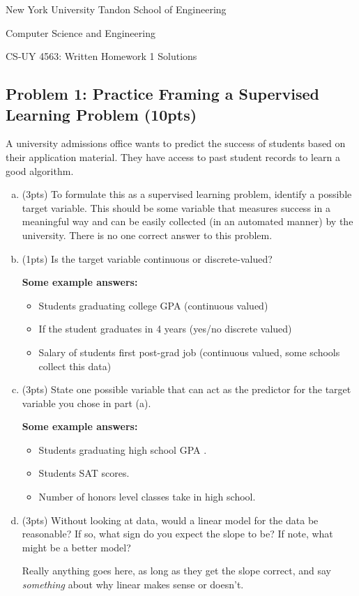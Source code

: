 \documentclass[10pt]{article}
\begin{document}
	
\begin{center}
	\normalsize
	New York University Tandon School of Engineering
	
	Computer Science and Engineering
	\medskip
	
	\large
	CS-UY 4563: Written Homework 1 Solutions


\end{center} 

\subsection{Problem 1: Practice Framing a Supervised Learning Problem (10pts)}
 A university admissions office wants to predict the success of students based on
their application material.  They have access to past student records to learn
a good algorithm.
\begin{enumerate}[(a)]
	\item (3pts) To formulate this as a supervised learning problem,
	identify a possible target variable.  This should be some variable that measures success
	in a meaningful way and can be easily collected (in an automated manner) by the
	university. There is no one correct answer to this problem.
	\item  (1pts) Is the target variable continuous or discrete-valued?
	
	\textbf{Some example answers:}
	\begin{itemize}
		\item Students graduating college GPA (continuous valued)
		\item If the student graduates in 4 years (yes/no discrete valued)
		\item Salary of students first post-grad job (continuous valued, some schools collect this data)
	\end{itemize}
	\item  (3pts) State one possible variable that can act as the predictor for the target
	variable you chose in part (a).
	
	\textbf{Some example answers:}
		\begin{itemize}
		\item Students graduating high school GPA .
		\item Students SAT scores.
		\item Number of honors level classes take in high school.
	\end{itemize}
	\item (3pts) Without looking at data, would a linear model for the data be reasonable?
	If so, what sign do you expect the slope to be? If note, what might be a better model?
	
	Really anything goes here, as long as they get the slope correct, and say \emph{something} about why linear makes sense or doesn't.

\end{enumerate}
\end{document}
